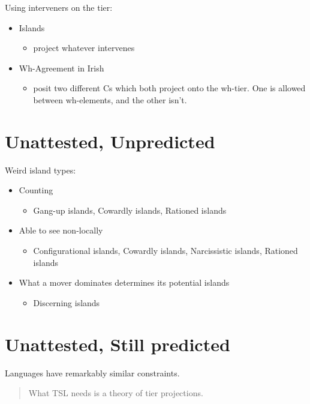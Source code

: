 Using interveners on the tier:

\begin{itemize}
  \item Islands
  \begin{itemize}
    \item project whatever intervenes
  \end{itemize}
  \item Wh-Agreement in Irish
  \begin{itemize}
    \item posit two different Cs which both project onto the wh-tier. One is allowed between wh-elements, and the other isn't.
  \end{itemize}
\end{itemize}

\section*{Unattested, Unpredicted}

Weird island types:

\begin{itemize}
  \item Counting
  \begin{itemize}
    \item Gang-up islands, Cowardly islands, Rationed islands
  \end{itemize}
  \item Able to see non-locally
  \begin{itemize}
    \item Configurational islands, Cowardly islands, Narcissistic islands, Rationed islands
  \end{itemize}
  \item What a mover dominates determines its potential islands
  \begin{itemize}
    \item Discerning islands
  \end{itemize}
\end{itemize}

\section*{Unattested, Still predicted}

Languages have remarkably similar constraints.

\begin{quote}
What TSL needs is a theory of tier projections.

\end{quote}

